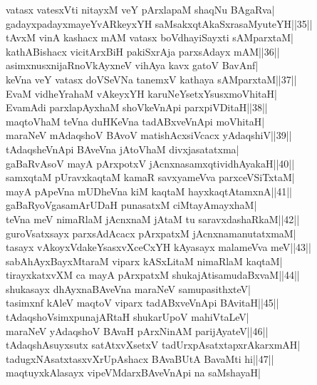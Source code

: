 \documentclass{article}
\begin{document}
vatasx vatesxVti nitayxM veY pArxlapaM shaqNu BAgaRva|\\
gadayxpadayxmayeYvARkeyxYH saMsakxqtAkaSxrasaMyuteYH||35||\\
tAvxM vinA kashacx mAM vatasx boVdhayiSayxti sAMparxtaM|\\
kathABishacx vicitArxBiH pakiSxrAja parxsAdayx mAM||36||\\
asimxnusxnijaRnoVkAyxneV vihAya kavx gatoV BavAnf|\\
keVna veY vatasx doVSeVNa tanemxV kathaya sAMparxtaM||37||\\
EvaM vidheYrahaM vAkeyxYH karuNeYsetxYsusxmoVhitaH|\\
EvamAdi parxlapAyxhaM shoVkeVnApi parxpiVDitaH||38||\\
maqtoVhaM teVna duHKeVna tadABxveVnApi moVhitaH|\\
maraNeV mAdaqshoV BAvoV matishAcxsiVcacx yAdaqshiV||39||\\
tAdaqsheVnApi BAveVna jAtoVhaM divxjasatatxma|\\
gaBaRvAsoV mayA pArxpotxV jAcnxnasamxqtividhAyakaH||40||\\
samxqtaM pUravxkaqtaM kamaR savxyameVva parxceVSiTxtaM|\\
mayA pApeVna mUDheVna kiM kaqtaM hayxkaqtAtamxnA||41||\\
gaBaRyoVgasamArUDaH punasatxM ciMtayAmayxhaM|\\
teVna meV nimaRlaM jAcnxnaM jAtaM tu saravxdashaRkaM||42||\\
guroVsatxsayx parxsAdAcacx pArxpatxM jAcnxnamanutatxmaM|\\
tasayx vAkoyxVdakeYsasxvXceCxYH kAyasayx malameVva meV||43||\\
sabAhAyxBayxMtaraM viparx kASxLitaM nimaRlaM kaqtaM|\\
tirayxkatxvXM ca mayA pArxpatxM shukajAtisamudaBxvaM||44||\\
shukasayx dhAyxnaBAveVna maraNeV samupasithxteV|\\
tasimxnf kAleV maqtoV viparx tadABxveVnApi BAvitaH||45||\\
tAdaqshoVsimxpunajARtaH shukarUpoV mahiVtaLeV|\\
maraNeV yAdaqshoV BAvaH pArxNinAM parijAyateV||46||\\
tAdaqshAsuyxsutx satAtxvXsetxV tadUrxpAsatxtapxrAkarxmAH|\\
tadugxNAsatxtasxvXrUpAshacx BAvaBUtA BavaMti hi||47||\\
maqtuyxkAlasayx vipeVMdarxBAveVnApi na saMshayaH|\\
\end{document}
